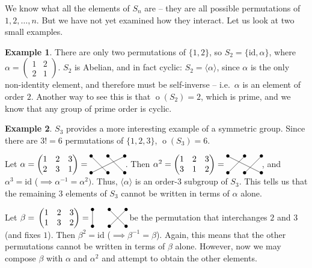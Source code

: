 \documentclass[svgnames]{article}
\theoremstyle{definition}
\newtheorem{Example}[Example]{Example}
\theoremstyle{remark}
\DeclareMathOperator{\ord}{o}
\newcommand{\id}{\mathrm{id}}
\begin{document}
\begin{appendices}
We know what all the elements of $S_n$ are -- they are all possible permutations of $1, 2, \ldots, n$. But we have not yet examined how they interact. Let us look at two small examples.

\begin{Example}\label{ex:S2}
There are only two permutations of $\{1, 2\}$, so $S_2 = \{\id, \alpha\}$, where $\alpha = \begin{pmatrix}1 & 2\\ 2 & 1\end{pmatrix}$. $S_2$ is Abelian, and in fact cyclic: $S_2 = \langle \alpha \rangle$, since $\alpha$ is the only non-identity element, and therefore must be self-inverse -- i.e.\ $\alpha$ is an element of order $2$. Another way to see this is that $\ord(S_2) = 2$, which is prime, and we know that any group of prime order is cyclic.
\end{Example}

\begin{Example}\label{ex:S3}
$S_3$ provides a more interesting example of a symmetric group. Since there are $3! = 6$ permutations of $\{1, 2, 3\}$, $\ord(S_3) = 6$.

Let $\alpha = \begin{pmatrix}
1 & 2 & 3\\
2 & 3 & 1
\end{pmatrix} = \,\vcenter{\xymatrix@=2em{
	*=0{\bullet} \ar@{-}[dr]	&	*=0{\bullet} \ar@{-}[dr]	&	*=0{\bullet} \ar@{-}[dll]\\
	*=0{\bullet}	&	*=0{\bullet}	&	*=0{\bullet}
}}$. Then $\alpha^2 = \begin{pmatrix}
1 & 2 & 3\\
3 & 1 & 2
\end{pmatrix} = \,\vcenter{\xymatrix@=2em{
	*=0{\bullet} \ar@{-}[drr]	&	*=0{\bullet} \ar@{-}[dl]	&	*=0{\bullet} \ar@{-}[dl]\\
	*=0{\bullet}	&	*=0{\bullet}	&	*=0{\bullet}
}}$, and $\alpha^3 = \id$ ($\implies \alpha^{-1} = \alpha^2)$. Thus, $\langle \alpha \rangle$ is an order-$3$ subgroup of $S_3$. This tells us that the remaining $3$ elements of $S_3$ cannot be written in terms of $\alpha$ alone.

Let $\beta = \,\begin{pmatrix}
1 & 2 & 3\\
1 & 3 & 2
\end{pmatrix} = \,\vcenter{\xymatrix@=2em{
	*=0{\bullet} \ar@{-}[d]		&	*=0{\bullet} \ar@{-}[dr]	&	*=0{\bullet} \ar@{-}[dl]\\
	*=0{\bullet}	&	*=0{\bullet}	&	*=0{\bullet}
}}$ be the permutation that interchanges $2$ and $3$ (and fixes $1$). Then $\beta^2 = \id$ ($\implies \beta^{-1} = \beta$). Again, this means that the other permutations cannot be written in terms of $\beta$ alone. However, now we may compose $\beta$ with $\alpha$ and $\alpha^2$ and attempt to obtain the other elements.


\end{Example}
\end{appendices}
\end{document}
